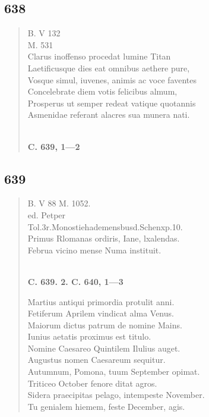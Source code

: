 \documentclass[11pt, a4paper]{report}
\begin{document}
            \subsection*{638}
      \begin{verse}
      B. V 132 \\ M. 531 \\ Clarus inoffenso procedat lumine Titan \\ Laetificusque dies eat omnibus aethere pure, \\ Vosque simul, iuvenes, animis ac voce faventes \\ Concelebrate diem votis felicibus almum, \\ Prosperus ut semper redeat vatique quotannis \\ Asmenidae referant alacres sua munera nati. \\ 
        ﻿\pagebreak 
     \marginpar{[105]} \begin{center} \textbf{C. 639, 1—2} \end{center}
      \end{verse}
  
            \subsection*{639}
      \begin{verse}
      B. V 88 M. 1052. \\ ed. Petper \\ Tol.3r.Monostiehademensbusd.Schenxp.10. \\ Primus Rlomanas ordiris, Iane, lxalendas. \\ Februa vicino mense Numa instituit. \\ 
        ﻿\pagebreak 
    \begin{center} \textbf{C. 639. 2. C. 640, 1—3} \end{center} \marginpar{[106]} Martius antiqui primordia protulit anni. \\ Fetiferum Aprilem vindicat alma Venus. \\ Maiorum dictus patrum de nomine Mains. \\ Iunius aetatis proximus est titulo. \\ Nomine Caesareo Quintilem Ilulius auget. \\ Augustus nomen Caesareum sequitur. \\ Autumnum, Pomona, tuum September opimat. \\ Triticeo October fenore ditat agros. \\ Sidera praecipitas pelago, intempeste November. \\ Tu genialem hiemem, feste December, agis. \\ 
      \end{verse}
  
\end{document}
